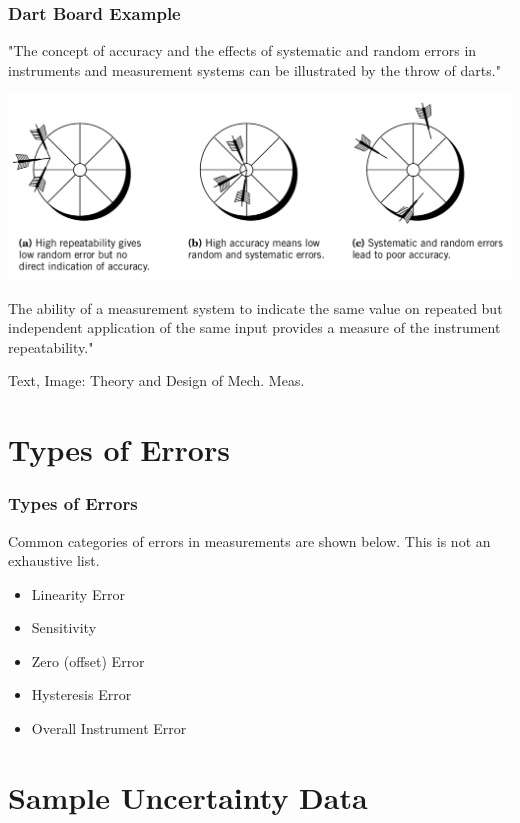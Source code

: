 \documentclass[fleqn]{beamer} %
\newcommand{\sectiontitleII}{Dart Board Example}
\newcommand{\sectiontitleIII}{Types of Errors}
\newcommand{\sectiontitleIV}{Sample Uncertainty Data}
\begin{document}
\begin{frame}[label=sectionIII]
\frametitle{\sectiontitleII}

"The concept of accuracy and the effects of {\PR systematic} and {\PN random} errors in instruments
and measurement systems can be illustrated by the throw of darts."

\includegraphics[scale=.20]{dart_throw.png}

The ability of a measurement system to indicate the same value on repeated but independent
application of the same input provides a measure of the instrument {\BL repeatability}."

{\tiny Text, Image: Theory and Design of Mech. Meas.}
\end{frame}


\section{\sectiontitleIII}

\begin{frame}[label=sectionIII]
\frametitle{\sectiontitleIII}

Common categories of errors in measurements are shown below. This is not an exhaustive list.  

\begin{itemize}
	
	\item Linearity Error \vspc
	\item Sensitivity \vspc
	\item Zero (offset) Error \vspc
	\item Hysteresis Error \vspc
	\item Overall Instrument Error \vspc
\end{itemize}


\end{frame}

\section{\sectiontitleIV}
\end{document}
